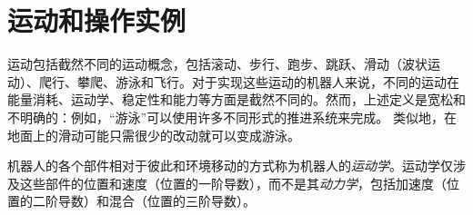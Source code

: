 \section{运动和操作实例}


运动包括截然不同的运动概念，包括滚动、步行、跑步、跳跃、滑动（波状运动）、爬行、攀爬、游泳和飞行。对于实现这些运动的机器人来说，不同的运动在能量消耗、运动学、稳定性和能力等方面是截然不同的。然而，上述定义是宽松和不明确的：例如，“游泳”可以使用许多不同形式的推进系统来完成。 类似地，在地面上的滑动可能只需很少的改动就可以变成游泳。


机器人的各个部件相对于彼此和环境移动的方式称为机器人的\emph{运动学}。运动学仅涉及这些部件的位置和速度（位置的一阶导数），而不是其\emph{动力学}，包括加速度（位置的二阶导数）和混合（位置的三阶导数）。


